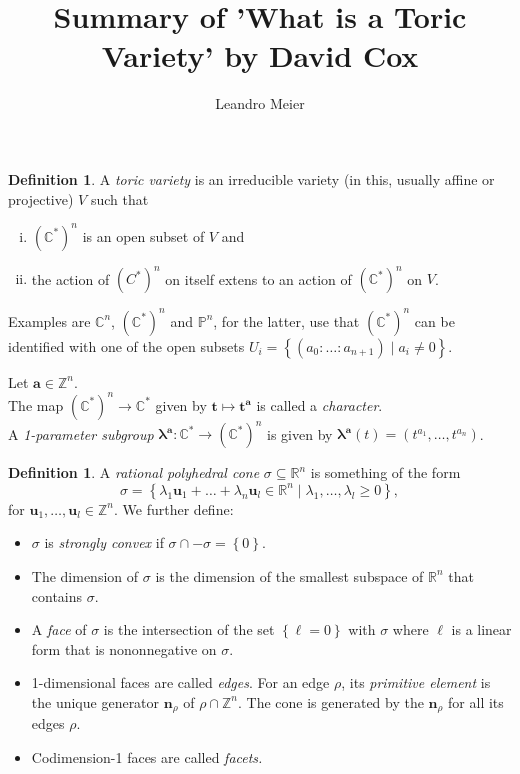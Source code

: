 \documentclass[a4paper]{article}
\title{Summary of 'What is a Toric Variety' by David Cox}
\author{Leandro Meier}
\date{}
\theoremstyle{definition}
\newtheorem{definition}[theorem]{Definition}
\begin{document}
\maketitle
\tableofcontents

\begin{definition}
  A \emph{toric variety} is an irreducible variety (in this, usually affine or projective) $V$ such that 
  \begin{enumerate}[(i)]
    \item $\left( \mathbb{C}^{*} \right)^{n}$ is an open subset of $V$ and
    \item the action of $\left( C^{*} \right)^{n}$ on itself extens to an action of $\left( \mathbb{C}^{*} \right) ^{n}$ on $V$.
  \end{enumerate}
\end{definition}
  Examples are $\mathbb{C}^{n}$, $\left( \mathbb{C}^{*} \right) ^{n}$ and $\mathbb{P}^{n}$, for the latter, use that $\left( \mathbb{C}^{*} \right) ^{n}$ can be identified with one of the open subsets $U_{i} = \left\{\left( a_{0} \colon \dots \colon a_{n+1} \right) \mid a_{i} \neq 0\right\}$.

  Let $\boldsymbol{a} \in \mathbb{Z}^{n}$.\\
  The map $\left( \mathbb{C}^{*} \right) ^{n} \rightarrow \mathbb{C}^{*}$ given by $\boldsymbol{t} \mapsto \boldsymbol{t^{a}}$ is called a \emph{character}.\\
  A \emph{1-parameter subgroup} $\boldsymbol{\lambda^{a}} \colon \mathbb{C}^{*} \rightarrow \left( \mathbb{C}^{*} \right) ^{n}$ is given by $\boldsymbol{\lambda^{a}} \left( t \right) = \left( t^{a_{1}}, \dots, t^{a_{n}} \right) $.

  \begin{definition}
    A \emph{rational polyhedral cone} $\sigma \subseteq \mathbb{R}^{n}$ is something of the form
    \[
      \sigma = \left\{ \lambda_{1}\boldsymbol{u} _{1} + \dots + \lambda_{n}\boldsymbol{u} _{l} \in \mathbb{R}^{n}\mid \lambda_{1}, \dots, \lambda_{l} \geq 0\right\},
    \]
    for $\boldsymbol{u} _{1}, \dots, \boldsymbol{u} _{l} \in \mathbb{Z}^{n}$. We further define:
    \begin{itemize}
      \item $\sigma $ is \emph{strongly convex} if $\sigma \cap - \sigma = \left\{ 0\right\} $.
      \item The dimension of $\sigma$ is the dimension of the smallest subspace of $\mathbb{R}^{n}$ that contains $\sigma$.
      \item A \emph{face} of $\sigma$ is the intersection of the set $\left\{\ell = 0\right\}$ with $\sigma$ where $\ell$ is a linear form that is nononnegative on $\sigma$.
      \item 1-dimensional faces are called \emph{edges}. For an edge $\rho$, its  \emph{primitive element} is the unique generator $\boldsymbol{n} _{\rho}$ of $\rho \cap \mathbb{Z}^{n}$. The cone is generated by the $\boldsymbol{n} _{\rho}$ for all its edges $\rho$.
      \item Codimension-1 faces are called \emph{facets.} 
    \end{itemize}
  \end{definition}
  
\end{document}
